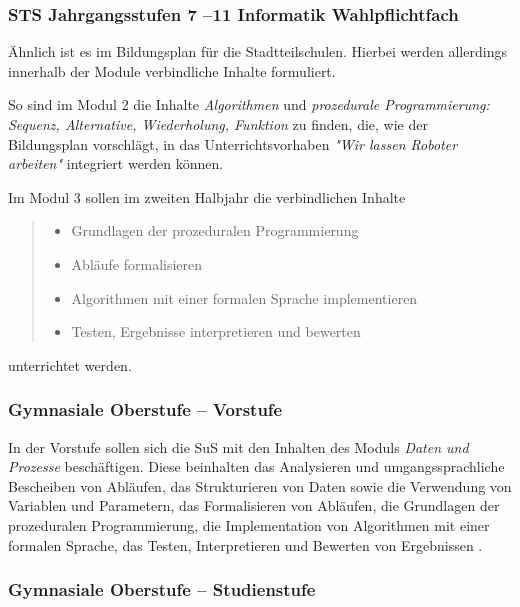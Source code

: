 \documentclass[paper=a4, DIV=calc, BCOR=15mm, twoside=on, onecolumn=on, open = right, titlepage =on, parskip =half, headsepline = on, footsepline = on, chapterprefix = off, appendixprefix = off, fontsize = 12pt, numbers = noenddot, abstract = on]{scrbook}
\begin{document}
\subsubsection{STS Jahrgangsstufen 7 --11 Informatik Wahlpflichtfach}
Ähnlich ist es im Bildungsplan für die Stadtteilschulen. Hierbei werden allerdings innerhalb der Module verbindliche Inhalte formuliert.

So sind im Modul 2 die Inhalte \emph{Algorithmen} und \emph{prozedurale Programmierung: Sequenz, Alternative, Wiederholung, Funktion} zu finden, die, wie der Bildungsplan vorschlägt, in das Unterrichtsvorhaben \emph{"Wir lassen Roboter arbeiten"} integriert werden können.

Im Modul 3 sollen im zweiten Halbjahr die verbindlichen Inhalte
\begin{quote}
\begin{itemize}
\item Grundlagen der prozeduralen Programmierung
\item Abläufe formalisieren
\item Algorithmen mit einer formalen Sprache implementieren
\item Testen, Ergebnisse interpretieren und bewerten \hfill \cite{stsmittel:14}
\end{itemize}
\end{quote}
unterrichtet werden.  


\subsubsection{Gymnasiale Oberstufe -- Vorstufe}

In der Vorstufe sollen sich die SuS mit den Inhalten des Moduls \emph{Daten und Prozesse} beschäftigen. Diese beinhalten das Analysieren und umgangssprachliche Bescheiben von Abläufen, das Strukturieren von Daten sowie die Verwendung von Variablen und Parametern, das Formalisieren von Abläufen, die Grundlagen der prozeduralen Programmierung, die Implementation von Algorithmen mit einer formalen Sprache, das Testen, Interpretieren und Bewerten von Ergebnissen \cite{oberstufe:09}. 

\subsubsection{Gymnasiale Oberstufe -- Studienstufe}
\end{document}
